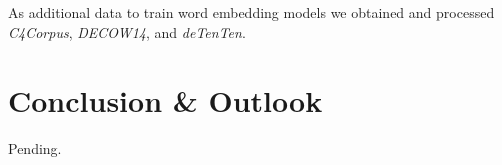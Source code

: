 \documentclass[11pt]{article}
\begin{document}
As additional data to train word embedding models we obtained and processed
\emph{C4Corpus}, \emph{DECOW14}, and \emph{deTenTen}.



\section{Conclusion \& Outlook}
\label{sec:conclusion}

\fxnote[inline]{}Pending.


\clearpage
%
%



\end{document}

